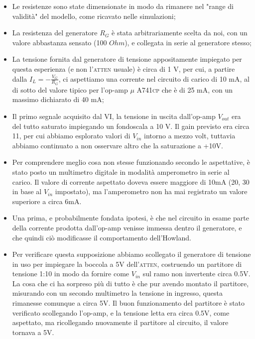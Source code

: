 \documentclass[journal, a4paper]{IEEEtran}
\begin{document}
\begin{itemize}
\item Le resistenze sono state dimensionate in modo da rimanere nel "range di validità" del modello, come ricavato nelle simulazioni;

\item La resistenza del generatore $R_G$ è stata arbitrariamente scelta da noi, con un valore abbastanza sensato (100 $\si{Ohm}$), e collegata in serie al generatore stesso;

\item La tensione fornita dal generatore di tensione appositamente impiegato per questa esperienza (e non l'\textsc{atten} usuale) è circa di 1 V, per cui, a partire dalla $I_L = - \frac{V_G}{R_G}$, ci aspettiamo una corrente nel circuito di carico di 10 mA, al di sotto del valore tipico per l'op-amp \textsc{$\mu$ A741cp} che è di 25 mA, con un massimo dichiarato di 40 mA;

\item Il primo segnale acquisito dal VI, la tensione in uscita dall'op-amp $V_{out}$ era del tutto saturato impiegando un fondoscala a 10 V. Il gain previsto era circa 11, per cui abbiamo esplorato valori di $V_{in}$ intorno a mezzo volt, tuttavia abbiamo continuato a non osservare altro che la saturazione a +10V.

\item Per comprendere meglio cosa non stesse funzionando secondo le aspettative, è stato posto un multimetro digitale in modalità amperometro in serie al carico. Il valore di corrente aspettato doveva essere maggiore di 10mA (20, 30 in base al $V_{in}$ impostato), ma l'amperometro non ha mai registrato un valore superiore a circa 6mA.

\item Una prima, e probabilmente fondata ipotesi, è che nel circuito in esame parte della corrente prodotta dall'op-amp venisse immessa dentro il generatore, e che quindi ciò modificasse il comportamento dell'Howland.

\item Per verificare questa supposizione abbiamo scollegato il generatore di tensione in uso per impiegare la boccola a 5V dell'\textsc{atten}, costruendo un partitore di tensione 1:10 in modo da fornire come $V_{in}$ sul ramo non invertente circa 0.5V. La cosa che ci ha sorpreso più di tutto è che pur avendo montato il partitore, misurando con un secondo multimetro la tensione in ingresso, questa rimanesse comunque a circa 5V. Il buon funzionamento del partitore è stato verificato scollegando l'op-amp, e la tensione letta era circa 0.5V, come aspettato, ma ricollegando nuovamente il partitore al circuito, il valore tornava a 5V. 


\end{itemize}
\end{document}
